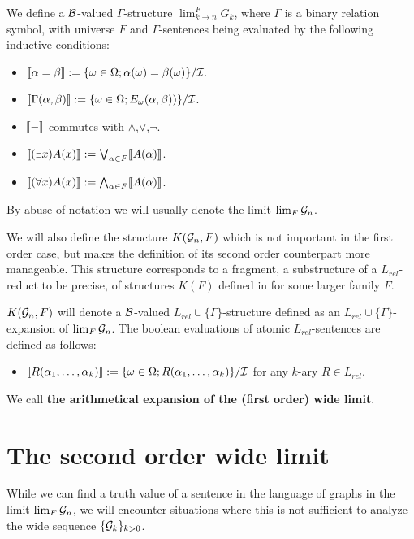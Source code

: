 \begin{defi}
We define a $\mathcal{B}$-valued $\Gamma$-structure $\lim_{k\to n}^{F}G_k$, where $\Gamma$ is a binary relation symbol, with universe $F$ and $\Gamma$-sentences being evaluated by the following inductive conditions:
\begin{itemize}
\item $\llbracket \alpha=\beta \rrbracket := \{\omega\in\Omega; \alpha(\omega)=\beta(\omega)\}/\mathcal{I}.$
\item $\llbracket \Gamma(\alpha,\beta) \rrbracket := \{\omega\in\Omega; E_\omega(\alpha,\beta))\}/\mathcal{I}$.
\item $\llbracket-\rrbracket$ commutes with $\land$,$\lor$,$\lnot$.
\item $\llbracket(\exists x)A(x)\rrbracket:=\bigvee_{\alpha\in F}\llbracket A(\alpha)\rrbracket$.
\item $\llbracket(\forall x)A(x)\rrbracket:=\bigwedge_{\alpha\in F}\llbracket A(\alpha)\rrbracket$.
\end{itemize}

By abuse of notation we will usually denote the limit $\lim_{F}\mathcal{G}_n$.
\end{defi}

We will also define the structure $K(\mathcal{G}_n,F)$ which is not important in the first order case, but makes the definition of its second order counterpart more manageable. This structure corresponds to a fragment, a substructure of a $L_{rel}$-reduct to be precise, of structures $K(F)$ defined in \cite{krajicek2010forcing} for some larger family $F$.


\begin{defi}
$K(\mathcal{G}_n,F)$ will denote a $\mathcal{B}$-valued $L_{rel}\cup\{\Gamma\}$-structure defined as an $L_{rel}\cup\{\Gamma\}$-expansion of $\lim_F\mathcal{G}_n$. The boolean evaluations of atomic $L_{rel}$-sentences are defined as follows:

\begin{itemize}
\item $\llbracket R(\alpha_1,\dots,\alpha_k) \rrbracket := \{\omega\in\Omega; R(\alpha_1,\dots,\alpha_k)\}/\mathcal{I}$ for any $k$-ary $R\in L_{rel}$.
\end{itemize}

We call \textbf{the arithmetical expansion of the (first order) wide limit}.
\end{defi}


\section{The second order wide limit}

While we can find a truth value of a sentence in the language of graphs in the limit $\lim_{F}\mathcal{G}_n$, we will encounter situations where this is not sufficient to analyze the wide sequence $\{\mathcal{G}_k\}_{k>0}$. 

